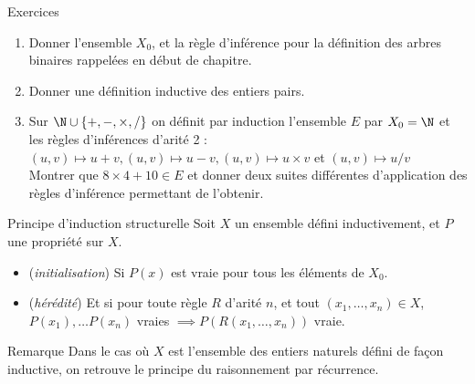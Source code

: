 \documentclass[10pt]{beamer}
\begin{document}
\begin{frame}[fragile]{\Ctitle}{\stitle}
	\begin{exampleblock}{Exercices}
		\begin{enumerate}
			\item<1-> Donner l'ensemble $X_0$, et la règle d'inférence pour la définition des arbres binaires rappelées en début de chapitre.
			\item<2-> Donner une définition inductive des entiers pairs.
			\item<3-> Sur $\N \cup \{+, -, \times, /\}$ on définit par induction l'ensemble $E$ par $X_0 = \N$ et les règles d'inférences d'arité 2 :
				$(u,v) \mapsto u + v, (u,v) \mapsto u - v, (u,v) \mapsto u \times v$ et $(u,v) \mapsto u / v$ \\
				Montrer que $8 \times 4 + 10 \in E$ et donner deux suites différentes d'application des règles d'inférence permettant de l'obtenir.
		\end{enumerate}
	\end{exampleblock}
\end{frame}

\begin{frame}[fragile]{\Ctitle}{\stitle}
	\begin{alertblock}{Principe d'induction structurelle}
		Soit $X$ un ensemble défini inductivement, et $P$ une propriété sur $X$.
		\begin{itemize}
			\item<2-> (\textit{initialisation}) Si $P(x)$ est vraie pour tous les éléments de $X_0$.
			\item<3-> (\textit{hérédité}) Et si pour toute règle $R$ d'arité $n$, et tout $(x_1,\dots,x_n) \in X$, $P(x_1), \dots P(x_n)$ vraies $\implies P(R(x_1,\dots,x_n))$ vraie.
		\end{itemize}
	\end{alertblock}
	{\begin{block}{Remarque}
			Dans le cas où $X$ est l'ensemble des entiers naturels défini de façon inductive, on retrouve le principe du raisonnement par récurrence.
		\end{block}}
\end{frame}
\end{document}
